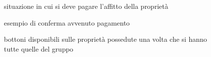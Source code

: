 \begin{figure}[H]
    \centering
    \caption{situazione in cui si deve pagare l'affitto della proprietà}
	\label{img:gamescreen}
\end{figure}
\begin{figure}[H]
    \centering
    \caption{esempio di conferma avvenuto pagamento}
	\label{img:gamescreen}
\end{figure}
\begin{figure}[H]
    \centering
    \caption{bottoni disponibili sulle proprietà possedute una volta che si hanno tutte quelle del gruppo}
	\label{img:gamescreen}
\end{figure}
